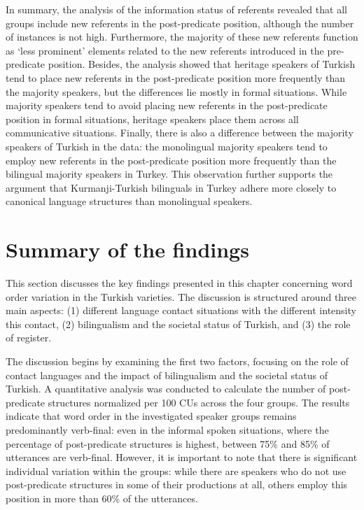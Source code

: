 In summary, the analysis of the information status of referents revealed that all groups include new referents in the post-predicate position, although the number of instances is not high. Furthermore, the majority of these new referents function as ‘less prominent’ elements related to the new referents introduced in the pre-predicate position. Besides, the analysis showed that heritage speakers of Turkish tend to place new referents in the post-predicate position more frequently than the majority speakers, but the differences lie mostly in formal situations. While majority speakers tend to avoid placing new referents in the post-predicate position in formal situations, heritage speakers place them across all communicative situations. Finally, there is also a difference between the majority speakers of Turkish in the data: the monolingual majority speakers tend to employ new referents in the post-predicate position more frequently than the bilingual majority speakers in Turkey. This observation further supports the argument that Kurmanji-Turkish bilinguals in Turkey adhere more closely to canonical language structures than monolingual speakers.

\section{Summary of the findings}\label{sec:key:5.5}

This section discusses the key findings presented in this chapter concerning word order variation in the Turkish varieties. The discussion is structured around three main aspects: (1) different language contact situations with the different intensity this contact, (2) bilingualism and the societal status of Turkish, and (3) the role of register.

The discussion begins by examining the first two factors, focusing on the role of contact languages and the impact of bilingualism and the societal status of Turkish. A quantitative analysis was conducted to calculate the number of post-predicate structures normalized per 100 CUs across the four groups. The results indicate that word order in the investigated speaker groups remains predominantly verb-final: even in the informal spoken situations, where the percentage of post-predicate structures is highest, between 75\% and 85\% of utterances are verb-final. However, it is important to note that there is significant individual variation within the groups: while there are speakers who do not use post-predicate structures in some of their productions at all, others employ this position in more than 60\% of the utterances.

